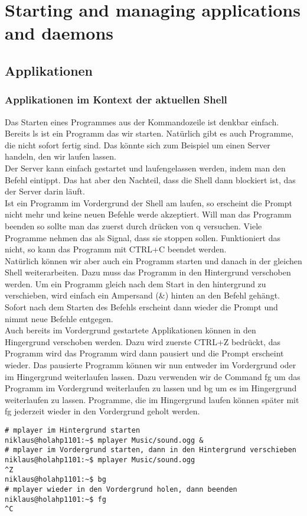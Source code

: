 \section{Starting and managing applications and daemons}
\subsection{Applikationen}
\subsubsection{Applikationen im Kontext der aktuellen Shell}
Das Starten eines Programmes aus der Kommandozeile ist denkbar einfach. Bereits ls ist ein Programm das wir starten. Nat\"urlich gibt es auch Programme, die nicht sofort fertig sind. Das k\"onnte sich zum Beispiel um einen Server handeln, den wir laufen lassen.\\
Der Server kann einfach gestartet und laufengelassen werden, indem man den Befehl eintippt. Das hat aber den Nachteil, dass die Shell dann blockiert ist, das der Server darin l\"auft.\\
Ist ein Programm im Vordergrund der Shell am laufen, so erscheint die Prompt nicht mehr und keine neuen Befehle werde akzeptiert. Will man das Programm beenden so sollte man das zuerst durch dr\"ucken von q versuchen. Viele Programme nehmen das als Signal, dass sie stoppen sollen. Funktioniert das nicht, so kann das Programm mit CTRL+C beendet werden.\\
Nat\"urlich k\"onnen wir aber auch ein Programm starten und danach in der gleichen Shell weiterarbeiten. Dazu muss das Programm in den Hintergrund verschoben werden. Um ein Programm gleich nach dem Start in den hintergrund zu verschieben, wird einfach ein Ampersand (\&) hinten an den Befehl geh\"angt. Sofort nach dem Starten des Befehls erscheint dann wieder die Prompt und nimmt neue Befehle entgegen.\\
Auch bereits im Vordergrund gestartete Applikationen k\"onnen in den Hingergrund verschoben werden. Dazu wird zuerste CTRL+Z bedr\"uckt, das Programm wird das Programm wird dann pausiert und die Prompt erscheint wieder. Das pausierte Programm k\"onnen wir nun entweder im Vordergrund oder im Hingergrund weiterlaufen lassen. Dazu verwenden wir de Command fg um das Programm im Vordergrund weiterlaufen zu lassen und bg um es im Hingergrund weiterlaufen zu lassen. Programme, die im Hingergrund laufen k\"onnen sp\"ater mit fg jederzeit wieder in den Vordergrund geholt werden.
\begin{lstlisting}
# mplayer im Hintergrund starten
niklaus@holahp1101:~$ mplayer Music/sound.ogg &
# mplayer im Vordergrund starten, dann in den Hintergrund verschieben
niklaus@holahp1101:~$ mplayer Music/sound.ogg
^Z
niklaus@holahp1101:~$ bg
# mplayer wieder in den Vordergrund holen, dann beenden
niklaus@holahp1101:~$ fg
^C
\end{lstlisting}

